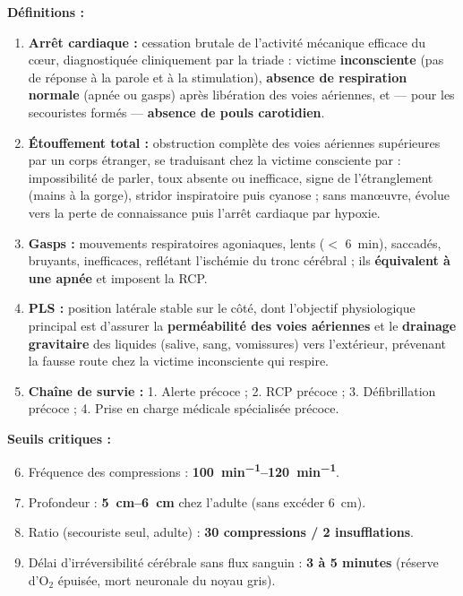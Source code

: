 \documentclass[11pt]{article}
\begin{document}
\begin{corrige}
\textbf{Définitions :}
\begin{enumerate}
    \item \textbf{Arrêt cardiaque :} cessation brutale de l'activité mécanique efficace du cœur, diagnostiquée cliniquement par la triade : victime \textbf{inconsciente} (pas de réponse à la parole et à la stimulation), \textbf{absence de respiration normale} (apnée ou gasps) après libération des voies aériennes, et — pour les secouristes formés — \textbf{absence de pouls carotidien}.
    \item \textbf{Étouffement total :} obstruction complète des voies aériennes supérieures par un corps étranger, se traduisant chez la victime consciente par : impossibilité de parler, toux absente ou inefficace, signe de l'étranglement (mains à la gorge), stridor inspiratoire puis cyanose ; sans manœuvre, évolue vers la perte de connaissance puis l'arrêt cardiaque par hypoxie.
    \item \textbf{Gasps :} mouvements respiratoires agoniaques, lents ($<$ \SI{6}{min}), saccadés, bruyants, inefficaces, reflétant l'ischémie du tronc cérébral ; ils \textbf{équivalent à une apnée} et imposent la RCP.
    \item \textbf{PLS :} position latérale stable sur le côté, dont l'objectif physiologique principal est d'assurer la \textbf{perméabilité des voies aériennes} et le \textbf{drainage gravitaire} des liquides (salive, sang, vomissures) vers l'extérieur, prévenant la fausse route chez la victime inconsciente qui respire.
    \item \textbf{Chaîne de survie :} 1. Alerte précoce ; 2. RCP précoce ; 3. Défibrillation précoce ; 4. Prise en charge médicale spécialisée précoce.
\end{enumerate}
\textbf{Seuils critiques :}
\begin{enumerate}
    \setcounter{enumi}{5}
    \item Fréquence des compressions : \textbf{\SIrange{100}{120}{min^{-1}}}.
    \item Profondeur : \textbf{\SIrange{5}{6}{cm}} chez l'adulte (sans excéder \SI{6}{cm}).
    \item Ratio (secouriste seul, adulte) : \textbf{30 compressions / 2 insufflations}.
    \item Délai d'irréversibilité cérébrale sans flux sanguin : \textbf{3 à 5 minutes} (réserve d'O$_2$ épuisée, mort neuronale du noyau gris).
\end{enumerate}
\end{corrige}
\end{document}
